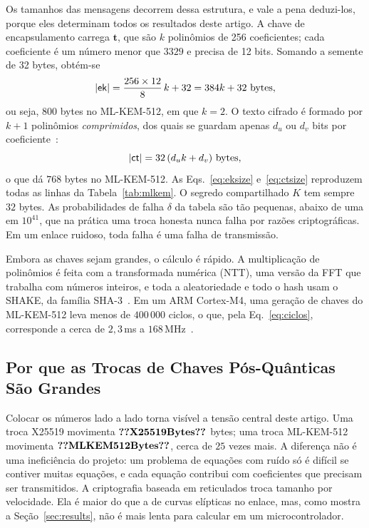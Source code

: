 Os tamanhos das mensagens decorrem dessa estrutura, e vale a pena deduzi-los,
porque eles determinam todos os resultados deste artigo. A chave de
encapsulamento carrega $\mathbf{t}$, que são $k$ polinômios de 256
coeficientes; cada coeficiente é um número menor que $3329$ e precisa de 12
bits. Somando a semente de 32 bytes, obtém-se~\cite{fips203}
\begin{equation}
|\mathsf{ek}| = \frac{256\times12}{8}\,k + 32 = 384k + 32 \ \text{bytes},
\label{eq:eksize}
\end{equation}
ou seja, $800$ bytes no ML-KEM-512, em que $k=2$. O texto cifrado é formado por
$k+1$ polinômios \emph{comprimidos}, dos quais se guardam apenas $d_u$ ou $d_v$
bits por coeficiente~\cite{fips203}:
\begin{equation}
|\mathsf{ct}| = 32\,(d_u k + d_v) \ \text{bytes},
\label{eq:ctsize}
\end{equation}
o que dá $768$ bytes no ML-KEM-512. As Eqs.~\eqref{eq:eksize}
e~\eqref{eq:ctsize} reproduzem todas as linhas da Tabela~\ref{tab:mlkem}. O
segredo compartilhado $K$ tem sempre $32$ bytes. As probabilidades de falha
$\delta$ da tabela são tão pequenas, abaixo de uma em $10^{41}$, que na prática
uma troca honesta nunca falha por razões criptográficas. Em um enlace ruidoso,
toda falha é uma falha de transmissão.

Embora as chaves sejam grandes, o cálculo é rápido. A multiplicação de
polinômios é feita com a transformada numérica (NTT), uma versão da FFT que
trabalha com números inteiros, e toda a aleatoriedade e todo o hash usam o
SHAKE, da família SHA-3~\cite{fips202}. Em um ARM Cortex-M4, uma geração de
chaves do ML-KEM-512 leva menos de $400\,000$ ciclos, o que, pela
Eq.~\eqref{eq:ciclos}, corresponde a cerca de $2{,}3$\,ms a
$168$\,MHz~\cite{pqm4}.

\subsection{Por que as Trocas de Chaves Pós-Quânticas São Grandes}\label{sec:fund-size}
Colocar os números lado a lado torna visível a tensão central deste artigo.
Uma troca X25519 movimenta $\val{X25519Bytes}$ bytes; uma troca ML-KEM-512
movimenta $\val{MLKEM512Bytes}$, cerca de $25$ vezes mais. A diferença não é uma
ineficiência do projeto: um problema de equações com ruído só é difícil se
contiver muitas equações, e cada equação contribui com coeficientes que
precisam ser transmitidos. A criptografia baseada em reticulados troca tamanho
por velocidade. Ela é maior do que a de curvas elípticas no enlace, mas, como
mostra a Seção~\ref{sec:results}, não é mais lenta para calcular em um
microcontrolador.

